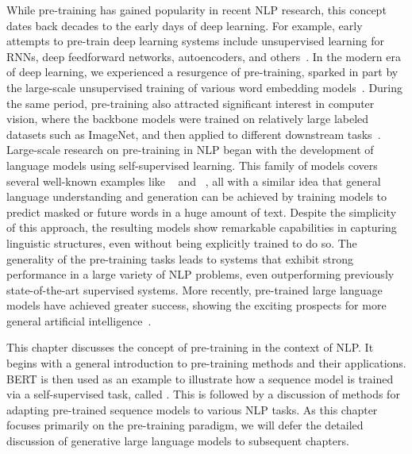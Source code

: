 While pre-training has gained popularity in recent NLP research, this concept dates back decades to the early days of deep learning. For example, early attempts to pre-train deep learning systems include unsupervised learning for RNNs, deep feedforward networks, autoencoders, and others~\cite{schmidhuber-etal:2015deep}. In the modern era of deep learning, we experienced a resurgence of pre-training, sparked in part by the large-scale unsupervised training of various word embedding models~\cite{Mikolov-et-al:2013distributed,pennington2014glove}. During the same period, pre-training also attracted significant interest in computer vision, where the backbone models were trained on relatively large labeled datasets such as ImageNet, and then applied to different downstream tasks~\cite{he-etal:2019rethinking,zoph-etal:2020rethinking}. Large-scale research on pre-training in NLP began with the development of language models using self-supervised learning. This family of models covers several well-known examples like ~\cite{devlin-etal:2019bert} and ~\cite{brown-etal:2020language}, all with a similar idea that general language understanding and generation can be achieved by training models to predict masked or future words in a huge amount of text. Despite the simplicity of this approach, the resulting models show remarkable capabilities in capturing linguistic structures, even without being explicitly trained to do so. The generality of the pre-training tasks leads to systems that exhibit strong performance in a large variety of NLP problems, even outperforming previously state-of-the-art supervised systems. More recently, pre-trained large language models have achieved greater success, showing the exciting prospects for more general artificial intelligence~\cite{bubeck-etal:2023sparks}.

This chapter discusses the concept of pre-training in the context of NLP. It begins with a general introduction to pre-training methods and their applications. BERT is then used as an example to illustrate how a sequence model is trained via a self-supervised task, called . This is followed by a discussion of methods for adapting pre-trained sequence models to various NLP tasks. As this chapter focuses primarily on the pre-training paradigm, we will defer the detailed discussion of generative large language models to subsequent chapters.


